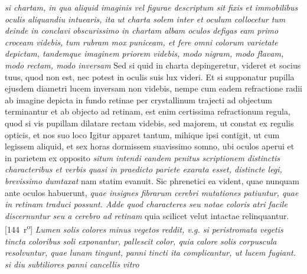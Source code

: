\textit{si chartam, in qua aliquid imaginis vel figurae descriptum sit fixis et immobilibus oculis aliquandiu intuearis, ita ut charta solem inter et oculum collocetur tum deinde in conclavi obscurissimo in chartam albam oculos defigas eam primo croceam\protect{} videbis, tum rubram mox puniceam\protect{}, et fere omni colorum varietate depictam, tandemque imaginem priorem videbis, modo nigram, modo flavam, modo rectam, modo inversam } Sed si quid in charta depingeretur, videret et socius tuus, quod non est, nec potest in oculis suis lux videri. Et si supponatur pupilla\protect{} ejusdem diametri lucem inversam non videbis, nempe cum eadem refractione radii ab imagine depicta in fundo retinae per crystallinum trajecti ad objectum terminantur et ab objecto ad retinam, est enim certissima refractionum regula, quod si vis pupillam\protect{} dilatare  rectam videbis, sed majorem, ut constat ex regulis opticis, et nos suo loco  Igitur apparet tantum, mihique ipsi contigit, ut cum legissem aliquid, et sex horas dormissem suavissimo somno\protect{}, ubi oculos aperui et in parietem ex opposito \textit{situm intendi eandem penitus scriptionem distinctis characteribus et verbis quasi in praedicto pariete exarata esset, distincte legi, brevissimo dumtaxat } nam statim evanuit. Sic phrenetici\protect{} ea vident, quae nunquam ante oculos habuerunt, \textit{quae insignes fibrarum cerebri\protect{} mutationes patiuntur, quae in retinam traduci possunt.
Adde quod characteres seu notae coloris atri facile discernuntur seu a cerebro ad retinam
}
quia scilicet velut intactae relinquantur.
[144~r\textsuperscript{o}]
\pend%
\count{}
\pstart%
%
%
%
% 
\textit{Lumen solis colores minus vegetos reddit, v.g. si peristromata\protect{} vegetis tincta coloribus soli exponantur, pallescit color, quia calore solis
corpuscula resolvuntur, quae lunam tingunt,
panni tincti ita complicantur, ut lucem fugiant.
si diu subtiliores panni cancellis vitro} 
